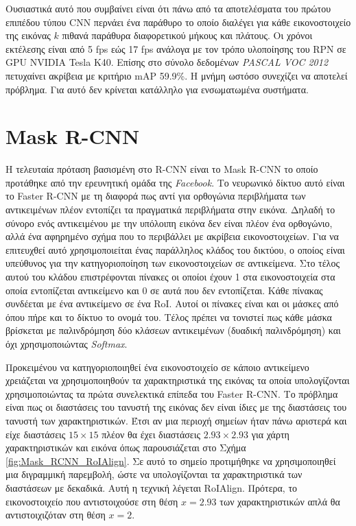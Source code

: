 Ουσιαστικά αυτό που συμβαίνει είναι ότι πάνω από τα αποτελέσματα του πρώτου επιπέδου τύπου CNN περνάει ένα παράθυρο το οποίο διαλέγει για κάθε εικονοστοιχείο της εικόνας $k$ πιθανά παράθυρα διαφορετικού μήκους και πλάτους. Οι χρόνοι εκτέλεσης είναι από 5 fps εώς 17 fps ανάλογα με τον τρόπο υλοποίησης του RPN σε GPU NVIDIA Tesla K40. Επίσης στο σύνολο δεδομένων \textit{PASCAL VOC 2012} πετυχαίνει ακρίβεια με κριτήριο mAP 59.9\%. H μνήμη ωστόσο συνεχίζει να αποτελεί πρόβλημα. Για αυτό δεν κρίνεται κατάλληλο για ενσωματωμένα συστήματα.

\section{Mask R-CNN \cite{13}}
Η τελευταία πρόταση βασισμένη στο R-CNN είναι το Mask R-CNN το οποίο προτάθηκε από την ερευνητική ομάδα της \textit{Facebook}. Το νευρωνικό δίκτυο αυτό είναι το Faster R-CNN με τη διαφορά πως αντί για ορθογώνια περιβλήματα των αντικειμένων πλέον εντοπίζει τα πραγματικά περιβλήματα στην εικόνα. Δηλαδή το σύνορο ενός αντικειμένου με την υπόλοιπη εικόνα δεν είναι πλέον ένα ορθογώνιο, αλλά ένα αφηρημένο σχήμα που το περιβάλλει με ακρίβεια εικονοστοιχείων. Για να επιτευχθεί αυτό χρησιμοποιείται ένας παράλληλος κλάδος του δικτύου, ο οποίος είναι υπεύθυνος για την κατηγοριοποίηση των εικονοστοιχείων σε αντικείμενα. Στο τέλος αυτού του κλάδου επιστρέφονται πίνακες οι οποίοι έχουν 1 στα εικονοστοιχεία στα οποία εντοπίζεται αντικείμενο και 0 σε αυτά που δεν εντοπίζεται. Κάθε πίνακας συνδέεται με ένα αντικείμενο σε ένα RoI. Αυτοί οι πίνακες είναι και οι μάσκες από όπου πήρε και το δίκτυο το ονομά του. Τέλος πρέπει να τονιστεί πως κάθε μάσκα βρίσκεται με παλινδρόμηση δύο κλάσεων αντικειμένων (δυαδική παλινδρόμηση) και όχι χρησιμοποιώντας \textit{Softmax}.

Προκειμένου να κατηγοριοποιηθεί ένα εικονοστοιχείο σε κάποιο αντικείμενο χρειάζεται να χρησιμοποιηθούν τα χαρακτηριστικά της εικόνας τα οποία υπολογίζονται χρησιμοποιώντας τα πρώτα συνελεκτικά επίπεδα του Faster R-CNN. Το πρόβλημα είναι πως οι διαστάσεις του τανυστή της εικόνας δεν είναι ίδιες με της διαστάσεις του τανυστή των χαρακτηριστικών. Έτσι αν μια περιοχή σημείων ήταν πάνω αριστερά και είχε διαστάσεις $15 \times 15$ πλέον θα έχει διαστάσεις $2.93 \times 2.93$ για χάρτη χαρακτηριστικών και εικόνα όπως παρουσιάζεται στο Σχήμα \ref{fig:Mask_RCNN_RoIAlign}. Σε αυτό το σημείο προτιμήθηκε να χρησιμοποιηθεί μια διγραμμική παρεμβολή, ώστε να υπολογίζονται τα χαρακτηριστικά των διαστάσεων με δεκαδικά. Αυτή η τεχνική λέγεται RoIAlign. Πρότερα, το εικονοστοιχείο που αντιστοιχούσε στη θέση $ x = 2.93$ των χαρακτηριστικών απλά θα αντιστοιχιζόταν στη θέση $ x = 2$.

